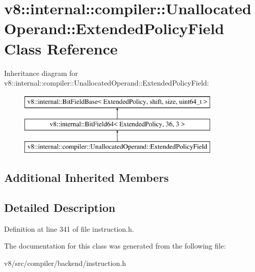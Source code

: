 \hypertarget{classv8_1_1internal_1_1compiler_1_1UnallocatedOperand_1_1ExtendedPolicyField}{}\section{v8\+:\+:internal\+:\+:compiler\+:\+:Unallocated\+Operand\+:\+:Extended\+Policy\+Field Class Reference}
\label{classv8_1_1internal_1_1compiler_1_1UnallocatedOperand_1_1ExtendedPolicyField}
Inheritance diagram for v8\+:\+:internal\+:\+:compiler\+:\+:Unallocated\+Operand\+:\+:Extended\+Policy\+Field\+:\begin{figure}[H]
\begin{center}
\leavevmode
\includegraphics[height=3.000000cm]{classv8_1_1internal_1_1compiler_1_1UnallocatedOperand_1_1ExtendedPolicyField}
\end{center}
\end{figure}
\subsection*{Additional Inherited Members}


\subsection{Detailed Description}


Definition at line 341 of file instruction.\+h.



The documentation for this class was generated from the following file\+:\begin{DoxyCompactItemize}
\item 
v8/src/compiler/backend/instruction.\+h\end{DoxyCompactItemize}
